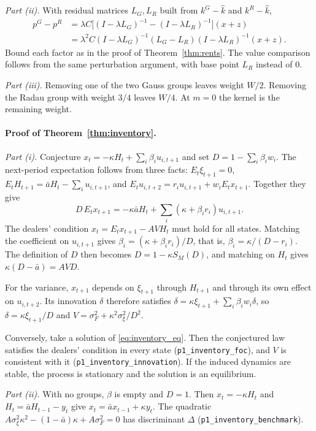 \documentclass[12pt]{article}
\theoremstyle{definition}
\theoremstyle{remark}
\begin{document}
\emph{Part (ii).} With residual matrices $L_G,L_R$ built from $k^G-\hat k$ and $k^R-\hat k$,
\begin{align*}
p^G-p^R&=\lambda C\bigl[(I-\lambda L_G)^{-1}-(I-\lambda L_R)^{-1}\bigr](x+z)\\
&=\lambda^2C(I-\lambda L_G)^{-1}(L_G-L_R)(I-\lambda L_R)^{-1}(x+z).
\end{align*}
Bound each factor as in the proof of Theorem~\ref{thm:rents}. The value comparison follows from the same perturbation argument, with base point $L_R$ instead of $0$.

\emph{Part (iii).} Removing one of the two Gauss groups leaves weight $W/2$. Removing the Radau group with weight $3/4$ leaves $W/4$. At $m=0$ the kernel is the remaining weight.


\paragraph{Proof of Theorem~\ref{thm:inventory}.}
\emph{Part (i).} Conjecture $x_t=-\kappa H_t+\sum_i\beta_iu_{i,t+1}$ and set $D=1-\sum_i\beta_iw_i$. The next-period expectation follows from three facts: $E_t\xi_{t+1}=0$, $E_tH_{t+1}=\bar aH_t-\sum_iu_{i,t+1}$, and $E_tu_{i,t+2}=r_iu_{i,t+1}+w_iE_tx_{t+1}$. Together they give
\[
 D\,E_tx_{t+1}=-\kappa\bar aH_t+\sum_i(\kappa+\beta_ir_i)u_{i,t+1}.
\]
The dealers' condition $x_t=E_tx_{t+1}-AVH_t$ must hold for all states. Matching the coefficient on $u_{i,t+1}$ gives $\beta_i=(\kappa+\beta_ir_i)/D$, that is, $\beta_i=\kappa/(D-r_i)$. The definition of $D$ then becomes $D=1-\kappa S_M(D)$, and matching on $H_t$ gives $\kappa(D-\bar a)=AVD$.

For the variance, $x_{t+1}$ depends on $\xi_{t+1}$ through $H_{t+1}$ and through its own effect on $u_{i,t+2}$. Its innovation $\delta$ therefore satisfies $\delta=\kappa\xi_{t+1}+\sum_i\beta_iw_i\delta$, so $\delta=\kappa\xi_{t+1}/D$ and $V=\sigma_F^2+\kappa^2\sigma_\xi^2/D^2$.

Conversely, take a solution of \eqref{eq:inventory_eq}. Then the conjectured law satisfies the dealers' condition in every state (\nolinkurl{p1_inventory_foc}), and $V$ is consistent with it (\nolinkurl{p1_inventory_innovation}). If the induced dynamics are stable, the process is stationary and the solution is an equilibrium.

\emph{Part (ii).} With no groups, $\beta$ is empty and $D=1$. Then $x_t=-\kappa H_t$ and $H_t=\bar aH_{t-1}-y_t$ give $x_t=\bar ax_{t-1}+\kappa y_t$. The quadratic $A\sigma_\xi^2\kappa^2-(1-\bar a)\kappa+A\sigma_F^2=0$ has discriminant $\Delta$ (\nolinkurl{p1_inventory_benchmark}).
\end{document}
